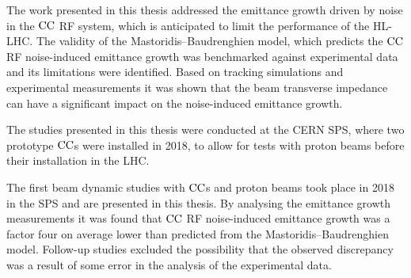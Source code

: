 \thispagestyle{simple} %

The work presented in this thesis addressed the emittance growth driven by noise in the ${\mathrm{CC}}$ RF system, which is anticipated to limit the performance of the HL-LHC. The validity of the Mastoridis--Baudrenghien model, which predicts the ${\mathrm{CC}}$ RF noise-induced emittance growth was benchmarked against experimental data and its limitations were identified. Based on tracking simulations and experimental measurements it was shown that the beam transverse impedance can have a significant impact on the noise-induced emittance growth. 

The studies presented in this thesis were conducted at the CERN SPS, where two prototype ${\mathrm{CC}}$s were installed in 2018, to allow for tests with proton beams before their installation in the LHC.

The first beam dynamic studies with ${\mathrm{CC}}$s and proton beams took place in 2018 in the SPS and are presented in this thesis. By analysing the emittance growth measurements it was found that ${\mathrm{CC}}$ RF noise-induced emittance growth was a factor four on average lower than predicted from the Mastoridis--Baudrenghien model. Follow-up studies excluded the possibility that the observed discrepancy was a result of some error in the analysis of the experimental data.




